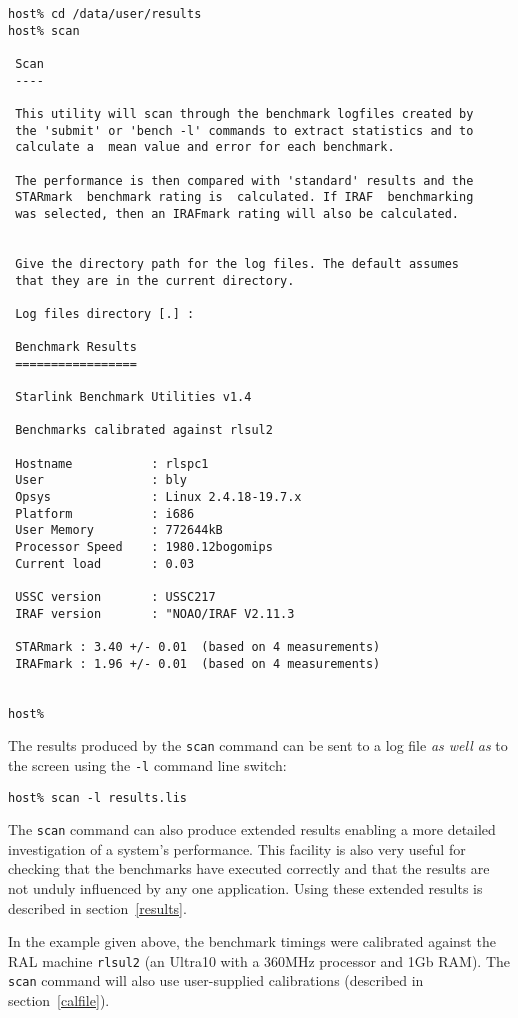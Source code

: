 \begin{verbatim}
host% cd /data/user/results
host% scan

 Scan
 ----

 This utility will scan through the benchmark logfiles created by
 the 'submit' or 'bench -l' commands to extract statistics and to
 calculate a  mean value and error for each benchmark.

 The performance is then compared with 'standard' results and the
 STARmark  benchmark rating is  calculated. If IRAF  benchmarking
 was selected, then an IRAFmark rating will also be calculated.


 Give the directory path for the log files. The default assumes
 that they are in the current directory.                       

 Log files directory [.] : 

 Benchmark Results
 =================

 Starlink Benchmark Utilities v1.4

 Benchmarks calibrated against rlsul2

 Hostname           : rlspc1
 User               : bly
 Opsys              : Linux 2.4.18-19.7.x
 Platform           : i686
 User Memory        : 772644kB
 Processor Speed    : 1980.12bogomips
 Current load       : 0.03

 USSC version	    : USSC217
 IRAF version	    : "NOAO/IRAF V2.11.3

 STARmark : 3.40 +/- 0.01  (based on 4 measurements)
 IRAFmark : 1.96 +/- 0.01  (based on 4 measurements)


host%
\end{verbatim} 

The results produced by the {\tt scan} command can be sent to a log file
{\em as well as} to the screen using the {\tt -l} command line switch:

{\tt host\% scan -l results.lis}

The {\tt scan} command can also produce extended results enabling a
more detailed investigation of a system's performance. This facility is
also very useful for checking that the benchmarks have executed correctly
and that the results are not unduly influenced by any one application.
Using these extended results is described in section~\ref{results}. 

In the example given above, the benchmark timings were calibrated
against the RAL machine {\tt rlsul2} (an Ultra10 with a 360MHz
processor and 1Gb RAM). The {\tt scan} command will also use user-supplied
calibrations (described in section~\ref{calfile}). 

